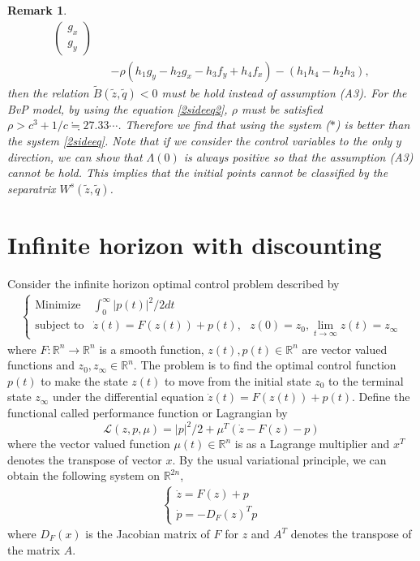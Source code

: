 \documentclass[11pt,reqno]{amsart}
\newtheorem{remark}[theorem]{Remark}
\begin{document}
\begin{remark}
\begin{eqnarray}
\begin{pmatrix}
g_x\\ 
g_y
\end{pmatrix}\nonumber\\
&&-\rho(h_1g_y-h_2g_x-h_3f_y+h_4f_x)-(h_1h_4-h_2h_3),\nonumber
\end{eqnarray}
then the relation $\tilde{B}(\tilde{z},\tilde{q})<0$ must be hold instead of assumption (A3). For the BvP model, by using the equation \eqref{2sideeq2}, $\rho$ must be satisfied $\rho>c^3+1/c\fallingdotseq 27.33\cdots$. Therefore we find that using the system ($\ast$) is better than the system \eqref{2sideeq}. Note that if we consider the control variables to the only $y$ direction, we can show that $\Lambda(0)$ is always positive so that the assumption (A3) cannot be hold. This implies that the initial points cannot be classified by the separatrix $W^s(\tilde{z},\tilde{q})$.
\end{remark}




\appendix


\section{Infinite horizon with discounting}\label{appA}

Consider the infinite horizon optimal control problem described by 
\begin{eqnarray}
\begin{cases}
\text{Minimize} & \int_0^\infty |p(t)|^2/2 dt \\
\text{subject to} & \dot{z}(t)=F(z(t))+p(t),\ \ \  \displaystyle z(0)=z_0, \lim_{t\to\infty}z(t)=z_\infty
\end{cases}
\end{eqnarray}
where $F:\mathbb{R}^n\to\mathbb{R}^n$ is a smooth function, $z(t),p(t)\in\mathbb{R}^n$ are vector valued functions and $z_0,z_\infty\in\mathbb{R}^n$.
The problem is to find the optimal control function $p(t)$ to make the state $z(t)$ to move from the initial state $z_0$ to the terminal state $z_\infty$ under the differential equation $\dot{z}(t)=F(z(t))+p(t)$. Define the functional called performance function or Lagrangian by
$$
\mathcal{L}(z,p,\mu)=|p|^2/2+\mu^T(\dot{z}-F(z)-p)
$$
where the vector valued function $\mu(t)\in\mathbb{R}^n$ is as a Lagrange multiplier and $x^T$ denotes the transpose of vector $x$. By the usual variational principle, we can obtain the following system on $\mathbb{R}^{2n}$,
\begin{eqnarray}\label{sys}
\begin{cases}
\dot{z}=F(z)+p\\
\dot{p}=-D_F(z)^T p
\end{cases}
\end{eqnarray}
where $D_F(x)$ is the Jacobian matrix of $F$ for $z$ and $A^T$ denotes the transpose of the matrix $A$.
\end{document}
